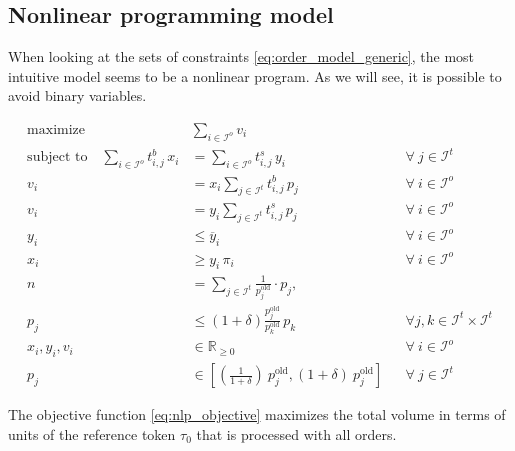 \documentclass[11pt,parskip=full]{scrartcl}%
\newcommand*{\itokens}{\mathcal{I}^t}       %
\newcommand*{\iorders}{\mathcal{I}^o}       %
\begin{document}


\newpage
\subsection{Nonlinear programming model}
\label{subsec:NLPmodel}

When looking at the sets of constraints \eqref{eq:order_model_generic}, the most intuitive model
seems to be a nonlinear program.
As we will see, it is possible to avoid binary variables.

\begin{subequations}
\begin{align}
  \text{maximize} \quad & \sum\limits_{i \in \iorders} v_i
  \label{eq:nlp_objective}
  \\[2mm]
  \text{subject to} \quad
  \sum\limits_{i \in \iorders} t^b_{i,j} \, x_i
  &= \sum\limits_{i \in \iorders} t^s_{i,j} \, y_i
  && \forall \> j \in \itokens
  \label{eq:nlp_tokenbalance}
  \\[2mm]
  v_i
  &= x_i \sum\limits_{j \in \itokens} t^b_{i,j} \, p_j
  && \forall \> i \in \iorders
  \label{eq:nlp_buyvolume}
  \\[1mm]
  v_i
  &= y_i \sum\limits_{j \in \itokens} t^s_{i,j} \, p_j
  && \forall \> i \in \iorders
  \label{eq:nlp_sellvolume}
  \\[2mm]
  y_i &\le \overline{y}_i
  && \forall \> i \in \iorders
  \label{eq:nlp_tokenamount_1}
  \\[1mm]
  x_i &\ge y_i \, \pi_i
  && \forall \> i \in \iorders
  \label{eq:nlp_tokenamount_2}
  \\[2mm]
  n
  &= \sum\limits_{j \in \itokens} \frac{1}{p^\mathrm{old}_j} \cdot p_j,
  \label{eq:nlp_reftoken}
  \\[1mm]
  p_j
  &\le \left(1+\delta\right) \frac{p^\mathrm{old}_j}{p^\mathrm{old}_k} \, p_k
  && \forall j,k \in \itokens \times \itokens
  \label{eq:nlp_maxfluct}
  \\[2mm]
  x_i, y_i, v_i &\in \mathbb{R}_{\ge 0}
  && \forall \> i \in \iorders
  \\[1mm]
  p_j
  &\in \left[ \left(\frac{1}{1+\delta}\right) \> p^\mathrm{old}_j, (1+\delta) \> p^\mathrm{old}_j
  \right]
  && \forall \> j \in \itokens
\end{align}
\label{eq:nlp}
\end{subequations}

The objective function \eqref{eq:nlp_objective} maximizes the total volume in terms of units of
the reference token $ \tau_0 $ that is processed with all orders.
\end{document}
